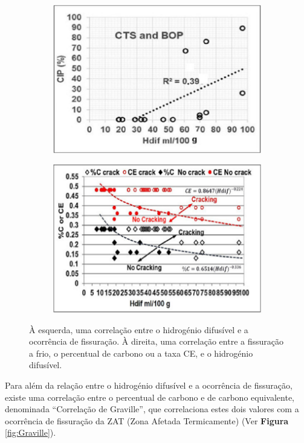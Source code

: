 \begin{figure}[htb]
\centering
\begin{subfigure}{.5\textwidth}
  \centering
  \includegraphics[width = 0.9\linewidth]{Figures/Cap2/Hdif_CE.png}
  \caption{}
  \label{fig:Hdif_CE}
\end{subfigure}%
\begin{subfigure}{.5\textwidth}
  \centering
  \includegraphics[width = 0.9\linewidth]{Figures/Cap2/CE_Hdif_Crack.png}
  \caption{}
  \label{fig:CE_Hdif_Crack}
\end{subfigure}
\caption[Correlações entre hidrogénio difusível e fissuração induzida por hidrogénio]%
{À esquerda, uma correlação entre o hidrogénio difusível e a ocorrência de fissuração. À direita, uma correlação entre a fissuração a frio, o percentual de carbono ou a taxa CE, e o hidrogénio difusível.}
\end{figure}
\par
Para além da relação entre o hidrogénio difusível e a ocorrência de fissuração, existe uma correlação entre o percentual de carbono e de carbono equivalente, denominada “Correlação de Graville”, que correlaciona estes dois valores com a ocorrência de fissuração da ZAT (Zona Afetada Termicamente) (Ver \textbf{Figura} \ref{fig:Graville})\cite{Olson2007}.

